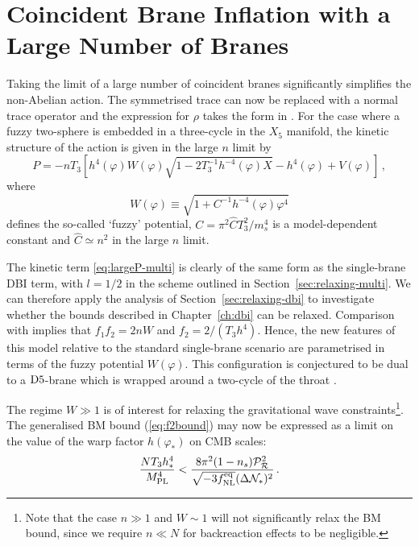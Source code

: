 \section{Coincident Brane Inflation with a Large Number of Branes}
\label{sec:twlargen-multi}
Taking the limit of a large number of coincident branes significantly
simplifies the non-Abelian action. The symmetrised trace can
now be replaced with a normal trace operator and the expression for $\rho$
takes the form in . 
% 
 For the case where a fuzzy two-sphere is 
embedded in a three-cycle in the $X_5$ manifold, 
the kinetic structure of the action is given in the large $n$ limit by 
\cite{thomasward}
% 
\begin{equation}
\label{eq:largeP-multi}
P=-nT_3 \left[ h^4(\varphi ) W(\varphi ) 
\sqrt{1-2 T_3^{-1} h^{-4}(\varphi) X}
-h^4(\varphi ) + V (\varphi ) \right] \,,
\end{equation}
% 
where
%    
\begin{equation} 
\label{eq:defW}
W (\varphi ) \equiv \sqrt{1+ C^{-1}h^{-4}(\varphi ) \varphi^4}
\end{equation}
% 
defines the so-called `fuzzy' potential, 
$C = \pi^2 \hat{C}T_3^2/m_s^4$ is a model-dependent constant and 
$\hat{C} \simeq n^2$ in the large $n$ limit. 

The kinetic term \eqref{eq:largeP-multi} is clearly of the same form as the
single-brane DBI term, with $l=1/2$ in the scheme outlined in
Section~\ref{sec:relaxing-multi}. We can therefore apply the analysis of
Section~\ref{sec:relaxing-dbi} to investigate whether the bounds described in
Chapter~\ref{ch:dbi} can be relaxed.
Comparison with  
implies that $f_1f_2 =2nW$ and $f_2=2/(T_3h^4)$. Hence, 
the new features of this model relative to the standard single-brane 
scenario are parametrised in terms of the fuzzy potential $W (\varphi )$. 
This configuration is conjectured to be dual to 
a ${\rm D5}$-brane which is wrapped around a two-cycle 
of the throat \cite{dual1,dual2,dual3}. 


The regime $W \gg 1$ is of interest for 
relaxing the gravitational wave constraints\footnote{Note that 
the case $n \gg 1$ and
$W \sim 1$ will not significantly relax the BM bound, 
since we require $n \ll N$ for backreaction effects to be negligible.}. 
The generalised BM bound (\ref{eq:f2bound}) may now be expressed as 
a limit on the value of the warp factor $h(\varphi_*)$ on CMB scales: 
% 
\begin{equation}
\label{eq:warptorelax}
\frac{NT_3h^4_*}{M_{\mathrm{PL}}^4} < 
\frac{8\pi^2 (1-n_s)\mathcal{P}_{\mathcal{R}}^2 }{\sqrt{-3f_{\mathrm{NL}}^{\mathrm{eq}}}(\Delta \mathcal{N}_*)^2} \,.
\end{equation}
% 


